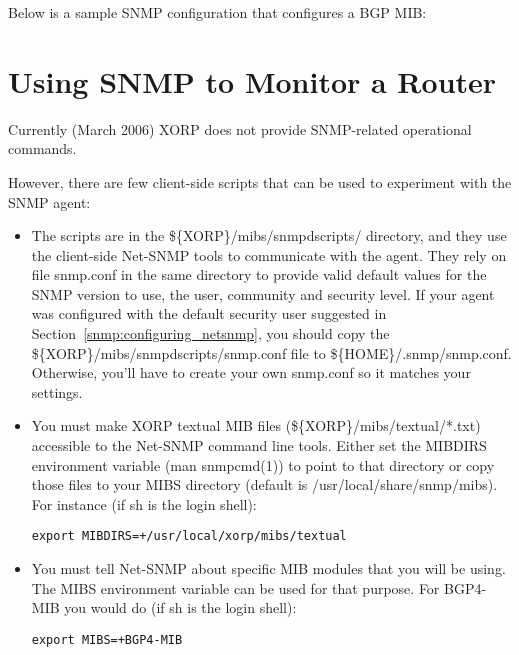 Below is a sample SNMP configuration that configures a BGP MIB:

\vspace{0.1in}
\noindent{}
\vspace{0.1in}

\section{Using SNMP to Monitor a Router}

Currently (March 2006) XORP does not provide SNMP-related operational
commands.

However, there are few client-side scripts that can be used to experiment
with the SNMP agent:

\begin{itemize}
  \item The scripts are in the
  {\stt \$\{XORP\}/mibs/snmpdscripts/} directory, and they use the client-side
  Net-SNMP tools to communicate with the agent.  They rely on file
  {\stt snmp.conf} in the same directory to provide valid default values for
  the SNMP version to use, the user, community and security level. If your
  agent was configured with the default security user suggested in
  Section~\ref{snmp:configuring_netsnmp}, you should copy the
  {\stt \$\{XORP\}/mibs/snmpdscripts/snmp.conf} file to
  {\stt \$\{HOME\}/.snmp/snmp.conf}. Otherwise, you'll have to create your
  own {\stt snmp.conf} so it matches your settings.

  \item You must make XORP textual MIB files
  ({\stt \$\{XORP\}/mibs/textual/*.txt}) accessible to the Net-SNMP command
  line tools.  Either set the {\stt MIBDIRS} environment variable
  ({\stt man snmpcmd(1)}) to point to that directory or copy those files to
  your MIBS directory (default is {\stt /usr/local/share/snmp/mibs}).  For
  instance (if {\stt sh} is the login shell):

  {\tt export MIBDIRS=+/usr/local/xorp/mibs/textual}

  \item You must tell Net-SNMP about specific MIB modules that you will
  be using.  The {\stt MIBS} environment variable can be used for that
  purpose. For BGP4-MIB you would do (if {\stt sh} is the login shell):

  {\tt export MIBS=+BGP4-MIB}

\end{itemize}
